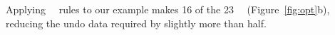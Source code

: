 Applying \nrb\ \patch\ rules to our example makes 16 of the 23 \patches\ \nrb\
(Figure~\ref{fig:opt}b),
%
reducing the undo data required by slightly more than half.


\begin{comment}
%
To avoid this overhead, \Kudos\ identifies \patches\ that will never
need to be reverted and omits their undo data. We call these \emph{\nrb}
\patches. (The opposite naturally being a \emph{\rb} \patch, when
necessary to differentiate them.)
%
Since a \nrb\ \patch\ cannot be reverted, a write of any \patches\
on block $\PB$ must include all \nrb\ \patches\ on $\PB$. To accordingly
update our formal model we define a new set of \patches, \PHard, which
contains all \nrb\ \patches. We write \PHard[\PB] to restrict the set
to block $\PB$\todo{Introduce \PSoft\ and \PSoft[\PB].}:

\begin{tabbing}
\textbf{Write block.} \\
\quad Pick some block $b$ with $\PMem[b] \neq \emptyset$. \\
\quad Pick some $P \subseteq \PMem[b]$ with $\PDepset{P} \subseteq P \cup
\PDisk$ and $\PHard[\PB] \subseteq P$. \\
\quad Move each $p \in P$ to $\PInf$ (in-flight). \\
\quad For each $p \in \PMem[\PB]-P$, set $\PDDepset{p} \gets \PDDepset{p}
\cup P$.
\end{tabbing}

\paragraph{}
To avoid (expensive) dependency traversals to determine whether a new
\patch\ will need to be reverted,
%
\Kudos\ conservatively identifies \nrb\ \patches\ using only local
dependency information.
%
\Kudos\ detects that a new \patch\ on block $\PB$ may need to be reverted if:
\todo{Which form is easier to read? Can we write \(\PMem - \PMem[\PB] - \PEmpty\) more concisely?}
%
\todo{Actually, our implementation also uses in flight \patches. Can we make
it not?}
%
\[ \PRDepset{\PMem[b]} \cap (\PMem - \PMem[b] - \PEmpty) \ne \emptyset \]
\[ \exists \inset{p}{\PMem[b]}\!:\
   \exists c\!:\ \exists \inset{q}{\PMem[c]}\!:\
   \indirdepends{q}{p} \]
%
This is both a safe and useful indicator because
%
the presence of an external \after\ is a necessary condition for a new
\patch's \before\ to induce a block-level cycle
%
and many blocks have no \patches\ with external \afters\ (e.g. most
file data blocks).


\end{comment}
